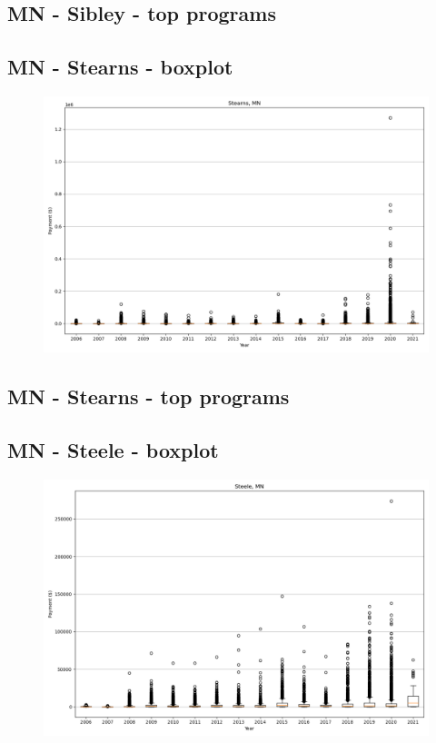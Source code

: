 \subsection*{MN - Sibley - top programs}

\newpage
\subsection*{MN - Stearns - boxplot}
\begin{figure}[h]
\centering
\includegraphics[width=7in]{../output/boxplots/counties/Stearns-MN_boxplot.png}
\end{figure}


\subsection*{MN - Stearns - top programs}

\newpage
\subsection*{MN - Steele - boxplot}
\begin{figure}[h]
\centering
\includegraphics[width=7in]{../output/boxplots/counties/Steele-MN_boxplot.png}
\end{figure}


